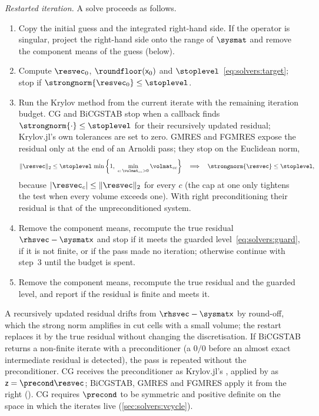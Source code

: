 \emph{Restarted iteration.} A solve proceeds as follows.
\begin{enumerate}
  \item Copy the initial guess and the integrated right-hand side. If the
    operator is singular, project the right-hand side onto the range of
    $\sysmat$ and remove the component means of the guess (below).
  \item Compute $\resvec_0$, $\roundfloor(\mathsf{x}_0)$ and
    $\stoplevel$~\cref{eq:solvers:target}; stop if
    $\strongnorm{\resvec_0}\le\stoplevel$.
  \item Run the Krylov method from the current iterate with the remaining
    iteration budget. CG and BiCGSTAB stop when a callback finds
    $\strongnorm{\cdot}\le\stoplevel$ for their recursively updated residual;
    Krylov.jl's own tolerances are set to zero. GMRES and FGMRES expose the
    residual only at the end of an Arnoldi pass; they stop on the Euclidean
    norm,
    \begin{equation}\label{eq:solvers:gmres}
      \norm{\resvec}_2\le\stoplevel\,\min\curlypar{1,\ \min_{c:\,\volmat_{cc}>0}\volmat_{cc}}
      \quad\Longrightarrow\quad\strongnorm{\resvec}\le\stoplevel,
    \end{equation}
    because $\abs{\resvec_c}\le\norm{\resvec}_2$ for every $c$ (the cap at one
    only tightens the test when every volume exceeds one). With right
    preconditioning their residual is that of the unpreconditioned system.
  \item Remove the component means, recompute the true residual
    $\rhsvec-\sysmat\mathsf{x}$ and stop if it meets the guarded
    level~\cref{eq:solvers:guard}, if it is not finite, or if the pass made no
    iteration; otherwise continue with step~3 until the budget is spent.
  \item Remove the component means, recompute the true residual and the
    guarded level, and report  if the residual is finite and
    meets it.
\end{enumerate}
A recursively updated residual drifts from $\rhsvec-\sysmat\mathsf{x}$ by
round-off, which the strong norm amplifies in cut cells with a small volume;
the restart replaces it by the true residual without changing the
discretisation. If BiCGSTAB returns a non-finite iterate with a
preconditioner (a $0/0$ before an almost exact intermediate residual is
detected), the pass is repeated without the preconditioner. CG receives the
preconditioner as Krylov.jl's , applied by  as
$\mathsf{z}=\precond\resvec$; BiCGSTAB, GMRES and FGMRES apply it from the right
(). CG requires $\precond$ to be symmetric and positive definite on
the space in which the iterates live (\cref{sec:solvers:vcycle}).


